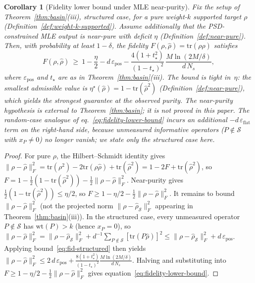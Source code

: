 \documentclass[twocolumn,prx,aps,superscriptaddress,longbibliography,floatfix]{revtex4-2}
\newtheorem{corollary}[theorem]{Corollary}
\newcommand{\pclaim}[4]{}
\begin{document}
\pclaim{env:cor:fidelity_lower_bound}{proved}{*}{cor:fidelity_lower_bound}%
\begin{corollary}[Fidelity lower bound under MLE near-purity]
\label{cor:fidelity_lower_bound}
Fix the setup of Theorem~\ref{thm:basin}(iii), structured case, for
a pure weight-$k$ supported target $\rho$
(Definition~\ref{def:weight-k-supported}).
Assume additionally that the PSD-constrained MLE output is
near-pure with deficit $\eta$ (Definition~\ref{def:near-pure}).
Then, with probability at least $1 - \delta$, the fidelity
$F(\rho,\hat\rho) = \mathrm{tr}(\rho\hat\rho)$ satisfies
\begin{equation}\label{eq:fidelity-lower-bound}
  F(\rho, \hat\rho)
  \ \ge\ 1 - \frac{\eta}{2}
  - d\,\varepsilon_{\mathrm{pos}}
  - \frac{4(1{+}t_\star^2)}{(1{-}t_\star)^2}
     \,\frac{M\ln(2M/\delta)}{d\,N_s},
\end{equation}
where $\varepsilon_{\mathrm{pos}}$ and $t_\star$ are as in
Theorem~\ref{thm:basin}(iii).
The bound is tight in~$\eta$: the smallest admissible value is
$\eta^{\star}(\hat\rho) = 1 - \mathrm{tr}(\hat\rho^2)$
(Definition~\ref{def:near-pure}), which yields the strongest
guarantee at the observed purity.
The near-purity hypothesis is external to Theorem~\ref{thm:basin};
it is not proved in this paper.
The random-case analogue of eq.~\eqref{eq:fidelity-lower-bound}
incurs an additional $-d\,\varepsilon_{\mathrm{flat}}$ term on the
right-hand side, because unmeasured informative operators
($P \notin \mathcal{S}$ with $x_P \neq 0$) no longer vanish;
we state only the structured case here.
\end{corollary}
\begin{proof}
For pure $\rho$, the Hilbert--Schmidt identity gives
$\|\rho - \hat\rho\|_F^2
= \mathrm{tr}(\rho^2) - 2\mathrm{tr}(\rho\hat\rho) + \mathrm{tr}(\hat\rho^2)
= 1 - 2F + \mathrm{tr}(\hat\rho^2)$, so
$F = 1 - \tfrac{1}{2}(1 - \mathrm{tr}(\hat\rho^2))
      - \tfrac{1}{2}\|\rho - \hat\rho\|_F^2$.
Near-purity gives
$\tfrac{1}{2}(1 - \mathrm{tr}(\hat\rho^2)) \le \eta/2$, so
$F \ge 1 - \eta/2 - \tfrac{1}{2}\|\rho - \hat\rho\|_F^2$.
It remains to bound $\|\rho - \hat\rho\|_F^2$ (not the projected
norm $\|\rho - \hat\rho_{\mathcal{S}}\|_F^2$ appearing in
Theorem~\ref{thm:basin}(iii)).  In the structured case, every
unmeasured operator $P \notin \mathcal{S}$ has $\mathrm{wt}(P) > k$
(hence $x_P = 0$), so
$\|\rho - \hat\rho\|_F^2
= \|\rho - \hat\rho_{\mathcal{S}}\|_F^2
+ d^{-1}\!\sum_{P \notin \mathcal{S}} [\mathrm{tr}(P\hat\rho)]^2
\le \|\rho - \hat\rho_{\mathcal{S}}\|_F^2
+ d\,\varepsilon_{\mathrm{pos}}$.
Applying bound~\eqref{eq:fid-structured} then yields
$\|\rho - \hat\rho\|_F^2 \le 2\,d\,\varepsilon_{\mathrm{pos}}
+ \tfrac{8(1+t_\star^2)}{(1-t_\star)^2}\tfrac{M\ln(2M/\delta)}{d\,N_s}$.
Halving and substituting into $F \ge 1 - \eta/2 - \tfrac{1}{2}\|\rho-\hat\rho\|_F^2$
gives equation~\eqref{eq:fidelity-lower-bound}.
\end{proof}
\end{document}
